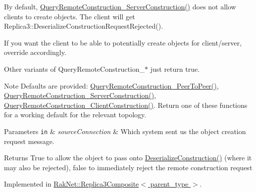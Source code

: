 By default, \hyperlink{class_rak_net_1_1_replica3_af5d3b25a95bbd91020d035ce9f6476a9}{Query\-Remote\-Construction\-\_\-\-Server\-Construction()} does not allow clients to create objects. The client will get Replica3\-::\-Deserialize\-Construction\-Request\-Rejected().\par
 If you want the client to be able to potentially create objects for client/server, override accordingly.\par
 Other variants of Query\-Remote\-Construction\-\_\-$\ast$ just return true. \begin{DoxyNote}{Note}
Defaults are provided\-: \hyperlink{class_rak_net_1_1_replica3_a6f398550955711b0a2b8366ca6627835}{Query\-Remote\-Construction\-\_\-\-Peer\-To\-Peer()}, \hyperlink{class_rak_net_1_1_replica3_af5d3b25a95bbd91020d035ce9f6476a9}{Query\-Remote\-Construction\-\_\-\-Server\-Construction()}, \hyperlink{class_rak_net_1_1_replica3_a8d72273c247770401da9d54b6bad4d16}{Query\-Remote\-Construction\-\_\-\-Client\-Construction()}. Return one of these functions for a working default for the relevant topology. 
\end{DoxyNote}

\begin{DoxyParams}[1]{Parameters}
\mbox{\tt in}  & {\em source\-Connection} & Which system sent us the object creation request message. \\
\hline
\end{DoxyParams}
\begin{DoxyReturn}{Returns}
True to allow the object to pass onto \hyperlink{class_rak_net_1_1_replica3_a8e18c95612054b601ce0149f91a5a34d}{Deserialize\-Construction()} (where it may also be rejected), false to immediately reject the remote construction request 
\end{DoxyReturn}


Implemented in \hyperlink{class_rak_net_1_1_replica3_composite_ae5f099064ed5168d7bb180aec8ca2eb5}{Rak\-Net\-::\-Replica3\-Composite$<$ parent\-\_\-type $>$}.

